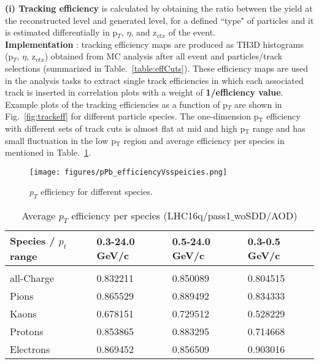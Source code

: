 
{\bf \normalsize (i) Tracking efficiency} is calculated by obtaining the ratio between the yield at the reconstructed level and generated level, for a defined ``type" of particles and it is estimated differentially in p$_T$, $\eta$, and z$_{vtx}$ of the event.\\
{\bf Implementation }: tracking efficiency maps are produced as TH3D histograms (p$_T$, $\eta$, z$_{vtx}$) obtained from MC analysis after all event and particles/track selections (summarized in Table.~\ref{table:effCuts}). These efficiency maps are used in the analysis tasks to extract single track efficiencies in which each associated track is inserted in correlation plots with a weight of {\bf 1/efficiency value}. Example plots of the tracking efficiencies as a function of p$_T$ are shown in Fig.~\ref{fig:trackeff} for different particle species. %
The one-dimension p$_\mathrm{T}$ efficiency with different sets of track cuts is almost flat at mid and high p$_\mathrm{T}$ range and has small fluctuation in the low p$_\mathrm{T}$ region and average efficiency per species in mentioned in Table.~\ref{table:AvgeffValue}.



\begin{figure}[h]
	\centering
	\texttt{[image: figures/pPb\_efficiencyVsspeicies.png]}
	\caption{$p_T$ efficiency for different species.}
	\label{fig:trackeffvsspecies}	
\end{figure}


\begin{table}[h]
\small
\centering %
\begin{tabular}{ p{3.5cm} | p{2.5cm} | p{2.5cm} |  p{2.5cm}  }
{\normalsize \textbf {Species / $p_t$ range }} & {\normalsize \textbf {0.3-24.0 GeV/c}} &   {\normalsize \textbf {0.5-24.0 GeV/c}} &   {\normalsize \textbf {0.3-0.5 GeV/c}}\\
\hline
&&\\		
all-Charge & 0.832211 & 0.850089 & 0.804515 \\
Pions & 0.865529 & 0.889492 & 0.834333 \\
Kaons & 0.678151 & 0.729512 & 0.528229 \\
Protons & 0.853865 & 0.883295 & 0.714668 \\
Electrons & 0.869452 & 0.856509 & 0.903016 \\
 \hline \hline
\end{tabular}
\caption{\large {Average $p_T$ efficiency per species (LHC16q/pass1$\_$woSDD/AOD)}} %
\label{table:AvgeffValue}	
\end{table}

